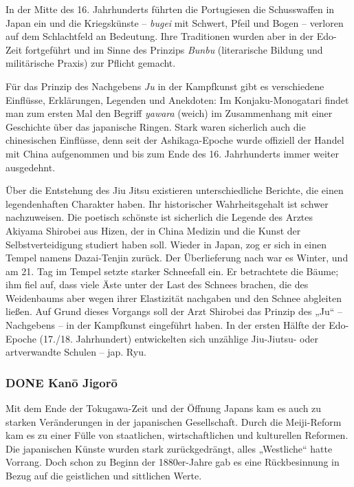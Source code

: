 \documentclass[11pt]{article}
\begin{document}
In der Mitte des 16. Jahrhunderts führten die Portugiesen die Schusswaffen in Japan ein und die Kriegskünste – \emph{bugei} mit Schwert, Pfeil und Bogen – verloren auf dem Schlachtfeld an Bedeutung. Ihre Traditionen wurden aber in der Edo-Zeit fortgeführt und im Sinne des Prinzips \emph{Bunbu} (literarische Bildung und militärische Praxis) zur Pflicht gemacht.

Für das Prinzip des Nachgebens \emph{Ju} in der Kampfkunst gibt es verschiedene Einflüsse, Erklärungen, Legenden und Anekdoten: Im Konjaku-Monogatari findet man zum ersten Mal den Begriff \emph{yawara} (weich) im Zusammenhang mit einer Geschichte über das japanische Ringen. Stark waren sicherlich auch die chinesischen Einflüsse, denn seit der Ashikaga-Epoche wurde offiziell der Handel mit China aufgenommen und bis zum Ende des 16. Jahrhunderts immer weiter ausgedehnt.

Über die Entstehung des \label{org8a57ef0}Jiu Jitsu existieren unterschiedliche Berichte, die einen legendenhaften Charakter haben. Ihr historischer Wahrheitsgehalt ist schwer nachzuweisen. Die poetisch schönste ist sicherlich die Legende des Arztes Akiyama Shirobei aus Hizen, der in China Medizin und die Kunst der Selbstverteidigung studiert haben soll. Wieder in Japan, zog er sich in einen Tempel namens Dazai-Tenjin zurück. Der Überlieferung nach war es Winter, und am 21. Tag im Tempel setzte starker Schneefall ein. Er betrachtete die Bäume; ihm fiel auf, dass viele Äste unter der Last des Schnees brachen, die des Weidenbaums aber wegen ihrer Elastizität nachgaben und den Schnee abgleiten ließen. Auf Grund dieses Vorgangs soll der Arzt Shirobei das Prinzip des „Ju“ – Nachgebens – in der Kampfkunst eingeführt haben. In der ersten Hälfte der Edo-Epoche (17./18. Jahrhundert) entwickelten sich unzählige Jiu-Jiutsu- oder artverwandte Schulen – jap. Ryu.

\subsubsection{{\bfseries\sffamily DONE} Kanō Jigorō}
\label{sec:org6952801}
Mit dem Ende der Tokugawa-Zeit und der Öffnung Japans kam es auch zu starken Veränderungen in der japanischen Gesellschaft. Durch die Meiji-Reform kam es zu einer Fülle von staatlichen, wirtschaftlichen und kulturellen Reformen. Die japanischen Künste wurden stark zurückgedrängt, alles „Westliche“ hatte Vorrang. Doch schon zu Beginn der 1880er-Jahre gab es eine Rückbesinnung in Bezug auf die geistlichen und sittlichen Werte.
\end{document}
